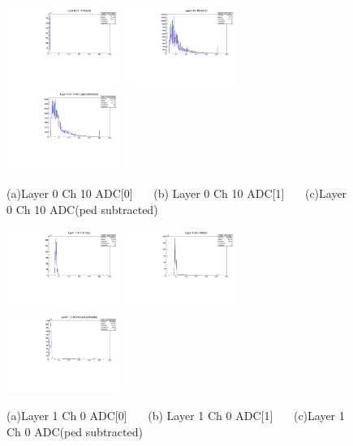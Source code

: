 \documentclass[a4paper,11pt]{article}
\theoremstyle{mytheor}
\begin{document}
\begin{figure}[H] 
\vspace*{-0.3cm} 
\includegraphics[width=0.33\textwidth,scale=0.5,trim=0 0 0 0,clip]{plotsdir/file0_test-Layer0_Ch10_adc0-1.pdf} 
\includegraphics[width=0.33\textwidth,scale=0.5,trim=0 0 0 0,clip]{plotsdir/file0_test-Layer0_Ch10_adc1-1.pdf} 
\includegraphics[width=0.33\textwidth,scale=0.5,trim=0 0 0 0,clip]{plotsdir/file0_test-Layer0_Ch10_adcPedsub-1.pdf} 
\caption{(a)Layer 0 Ch 10 ADC[0] ~~~(b) Layer 0 Ch 10 ADC[1] ~~~(c)Layer 0 Ch 10 ADC(ped subtracted) } 
\end{figure} 
\begin{figure}[H] 
\vspace*{-0.3cm} 
\includegraphics[width=0.33\textwidth,scale=0.5,trim=0 0 0 0,clip]{plotsdir/file0_test-Layer1_Ch0_adc0-1.pdf} 
\includegraphics[width=0.33\textwidth,scale=0.5,trim=0 0 0 0,clip]{plotsdir/file0_test-Layer1_Ch0_adc1-1.pdf} 
\includegraphics[width=0.33\textwidth,scale=0.5,trim=0 0 0 0,clip]{plotsdir/file0_test-Layer1_Ch0_adcPedsub-1.pdf} 
\caption{(a)Layer 1 Ch 0 ADC[0] ~~~(b) Layer 1 Ch 0 ADC[1] ~~~(c)Layer 1 Ch 0 ADC(ped subtracted) } 
\end{figure} 
\end{document}
